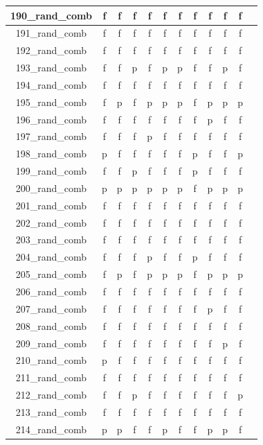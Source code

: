 \documentclass[
fancyheadings, %
%
%
]{stsreprt}
\begin{document}
\begin{longtable}{|c|c|c|c|c|c|c|c|c|c|c|c|}
\hline
190\_rand\_comb  & f & f & f & f & f & f & f & f & f & f \\
\hline
191\_rand\_comb  & f & f & f & f & f & f & f & f & f & f \\
\hline
192\_rand\_comb  & f & f & f & f & f & f & f & f & f & f \\
\hline
193\_rand\_comb & f & f & p & f & p & p & f & f & p & f \\
\hline
194\_rand\_comb  & f & f & f & f & f & f & f & f & f & f \\
\hline
195\_rand\_comb & f & p & f & p & p & p & f & p & p & p \\
\hline
196\_rand\_comb & f & f & f & f & f & f & f & p & f & f \\
\hline
197\_rand\_comb & f & f & f & p & f & f & f & f & f & f \\
\hline
198\_rand\_comb & p & f & f & f & f & f & p & f & f & p \\
\hline
199\_rand\_comb & f & f & p & f & f & f & p & f & f & f \\
\hline
200\_rand\_comb & p & p & p & p & p & p & f & p & p & p \\
\hline
201\_rand\_comb  & f & f & f & f & f & f & f & f & f & f \\
\hline
202\_rand\_comb  & f & f & f & f & f & f & f & f & f & f \\
\hline
203\_rand\_comb  & f & f & f & f & f & f & f & f & f & f \\
\hline
204\_rand\_comb & f & f & f & p & f & f & p & f & f & f \\
\hline
205\_rand\_comb & f & p & f & p & p & p & f & p & p & p \\
\hline
206\_rand\_comb  & f & f & f & f & f & f & f & f & f & f \\
\hline
207\_rand\_comb & f & f & f & f & f & f & f & p & f & f \\
\hline
208\_rand\_comb  & f & f & f & f & f & f & f & f & f & f \\
\hline
209\_rand\_comb & f & f & f & f & f & f & f & f & p & f \\
\hline
210\_rand\_comb & p & f & f & f & f & f & f & f & f & f \\
\hline
211\_rand\_comb  & f & f & f & f & f & f & f & f & f & f \\
\hline
212\_rand\_comb & f & f & p & f & f & f & f & f & f & p \\
\hline
213\_rand\_comb  & f & f & f & f & f & f & f & f & f & f \\
\hline
214\_rand\_comb & p & p & f & f & p & f & f & p & p & f \\

\end{longtable}
\end{document}
